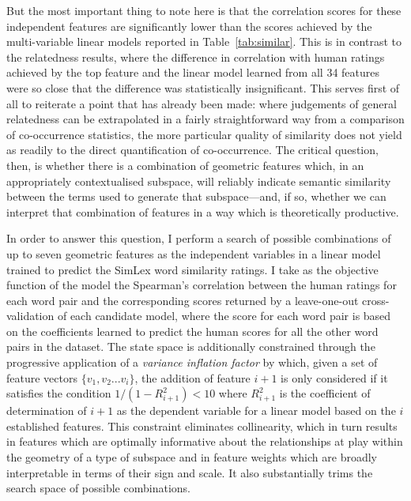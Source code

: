 But the most important thing to note here is that the correlation scores for these independent features are significantly lower than the scores achieved by the multi-variable linear models reported in Table~\ref{tab:similar}.  This is in contrast to the relatedness results, where the difference in correlation with human ratings achieved by the top feature and the linear model learned from all 34 features were so close that the difference was statistically insignificant.  This serves first of all to reiterate a point that has already been made: where judgements of general relatedness can be extrapolated in a fairly straightforward way from a comparison of co-occurrence statistics, the more particular quality of similarity does not yield as readily to the direct quantification of co-occurrence.  The critical question, then, is whether there is a combination of geometric features which, in an appropriately contextualised subspace, will reliably indicate semantic similarity between the terms used to generate that subspace---and, if so, whether we can interpret that combination of features in a way which is theoretically productive.

In order to answer this question, I perform a search of possible combinations of up to seven geometric features as the independent variables in a linear model trained to predict the SimLex word similarity ratings.  I take as the objective function of the model the Spearman's correlation between the human ratings for each word pair and the corresponding scores returned by a leave-one-out cross-validation of each candidate model, where the score for each word pair is based on the coefficients learned to predict the human scores for all the other word pairs in the dataset.  The state space is additionally constrained through the progressive application of a \emph{variance inflation factor} \citep{OBrien2007} by which, given a set of feature vectors $\{v_1,v_2... v_i\}$, the addition of feature $i+1$ is only considered if it satisfies the condition $1/(1-R_{i+1}^{2}) < 10$ where $R_{i+1}^2$ is the coefficient of determination of $i+1$ as the dependent variable for a linear model based on the $i$ established features.  This constraint eliminates collinearity, which in turn results in features which are optimally informative about the relationships at play within the geometry of a type of subspace and in feature weights which are broadly interpretable in terms of their sign and scale.  It also substantially trims the search space of possible combinations.

